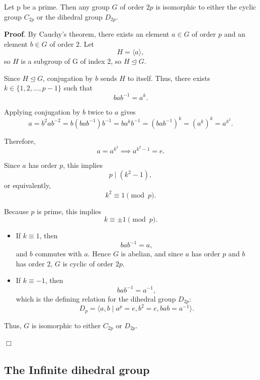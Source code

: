 \documentclass[../main.tex]{subfiles}
\begin{document}
\begin{theorem}
Let p be a prime. Then any group $G$ of order $2p$ is isomorphic to either the cyclic group $C_{2p}$ or the dihedral group $D_{2p}$.

\textbf{Proof}.  
By Cauchy's theorem, there exists an element \( a \in G \) of order $p$ and an element \( b \in G \) of order $2$. Let
\[
H = \langle a \rangle,
\]
so \( H \) is a subgroup of G of index 2, so \( H \trianglelefteq G \).

Since \( H \trianglelefteq G \), conjugation by \( b \) sends \( H \) to itself. Thus, there exists \( k \in \{1, 2, \ldots, p-1\} \) such that
\[
b a b^{-1} = a^k.
\]

Applying conjugation by \( b \) twice to \( a \) gives
\[
a = b^2 a b^{-2} = b (b a b^{-1}) b^{-1} = b a^k b^{-1} = (b a b^{-1})^k = (a^k)^k = a^{k^2}.
\]

Therefore,
\[
a = a^{k^2} \implies a^{k^2 - 1} = e.
\]

Since \( a \) has order \( p \), this implies
\[
p \mid (k^2 - 1),
\]
or equivalently,
\[
k^2 \equiv 1 \pmod p.
\]

Because \( p \) is prime, this implies
\[
k \equiv \pm 1 \pmod p.
\]

\begin{itemize}
\item If \( k \equiv 1 \), then
\[
b a b^{-1} = a,
\]
and \( b \) commutes with \( a \). Hence \( G \) is abelian, and since \( a \) has order \( p \) and \( b \) has order 2, \( G \) is cyclic of order \( 2p \).

\item If \( k \equiv -1 \), then
\[
b a b^{-1} = a^{-1},
\]
which is the defining relation for the dihedral group \( D_{2p} \):
\[
D_p = \langle a, b \mid a^p = e, b^2 = e, b a b = a^{-1} \rangle.
\]
\end{itemize}

Thus, \( G \) is isomorphic to either \( C_{2p} \) or \( D_{2p} \).

\hfill\(\Box\)
\end{theorem}

\subsection{The Infinite dihedral group}
\end{document}
